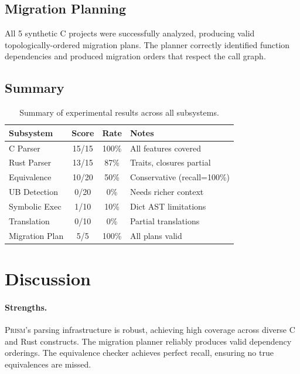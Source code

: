 \documentclass[11pt,a4paper]{article}
\begin{document}
\subsection{Migration Planning}\label{sec:exp-migration}

All 5 synthetic C projects were successfully analyzed, producing
valid topologically-ordered migration plans. The planner correctly
identified function dependencies and produced migration orders that
respect the call graph.

\subsection{Summary}

\begin{table}[t]
\centering
\caption{Summary of experimental results across all subsystems.}
\label{tab:summary}
\begin{tabular}{lccl}
\toprule
Subsystem & Score & Rate & Notes \\
\midrule
C Parser          & 15/15  & 100\% & All features covered \\
Rust Parser       & 13/15  & 87\%  & Traits, closures partial \\
Equivalence       & 10/20  & 50\%  & Conservative (recall=100\%) \\
UB Detection      & 0/20   & 0\%   & Needs richer context \\
Symbolic Exec     & 1/10   & 10\%  & Dict AST limitations \\
Translation       & 0/10   & 0\%   & Partial translations \\
Migration Plan    & 5/5    & 100\% & All plans valid \\
\bottomrule
\end{tabular}
\end{table}


\section{Discussion}\label{sec:discussion}

\paragraph{Strengths.} \textsc{Prism}'s parsing infrastructure is
robust, achieving high coverage across diverse C and Rust constructs.
The migration planner reliably produces valid dependency orderings.
The equivalence checker achieves perfect recall, ensuring no true
equivalences are missed.
\end{document}
